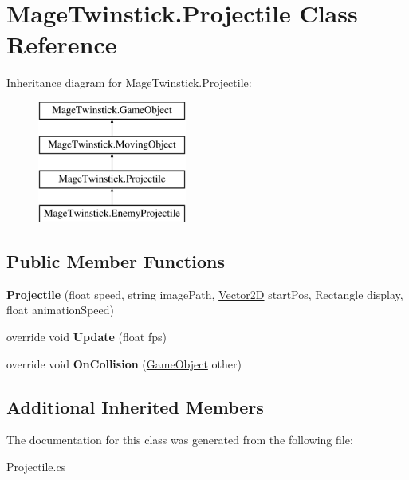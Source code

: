 \hypertarget{class_mage_twinstick_1_1_projectile}{}\section{Mage\+Twinstick.\+Projectile Class Reference}
\label{class_mage_twinstick_1_1_projectile}
Inheritance diagram for Mage\+Twinstick.\+Projectile\+:\begin{figure}[H]
\begin{center}
\leavevmode
\includegraphics[height=4.000000cm]{class_mage_twinstick_1_1_projectile}
\end{center}
\end{figure}
\subsection*{Public Member Functions}
\begin{DoxyCompactItemize}
\item 
\hypertarget{class_mage_twinstick_1_1_projectile_a2e18fb2d662c973c867069a248b5a5ed}{}{\bfseries Projectile} (float speed, string image\+Path, \hyperlink{class_mage_twinstick_1_1_vector2_d}{Vector2\+D} start\+Pos, Rectangle display, float animation\+Speed)\label{class_mage_twinstick_1_1_projectile_a2e18fb2d662c973c867069a248b5a5ed}

\item 
\hypertarget{class_mage_twinstick_1_1_projectile_a9208eff25bc92289191d5470bbc7015a}{}override void {\bfseries Update} (float fps)\label{class_mage_twinstick_1_1_projectile_a9208eff25bc92289191d5470bbc7015a}

\item 
\hypertarget{class_mage_twinstick_1_1_projectile_ad646d013997eceb12a0ac2f5df56d3bb}{}override void {\bfseries On\+Collision} (\hyperlink{class_mage_twinstick_1_1_game_object}{Game\+Object} other)\label{class_mage_twinstick_1_1_projectile_ad646d013997eceb12a0ac2f5df56d3bb}

\end{DoxyCompactItemize}
\subsection*{Additional Inherited Members}


The documentation for this class was generated from the following file\+:\begin{DoxyCompactItemize}
\item 
Projectile.\+cs\end{DoxyCompactItemize}
